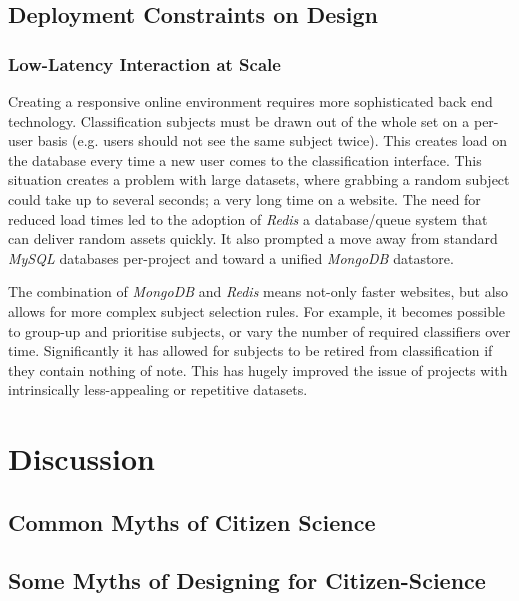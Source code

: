 \documentclass{sigchi}
\begin{document}
\subsection{Deployment Constraints on Design}

\subsubsection{Low-Latency Interaction at Scale}
Creating a responsive online environment requires more sophisticated back end technology. Classification subjects must be drawn out of the whole set on a per-user basis (e.g. users should not see the same subject twice). This creates load on the database every time a new user comes to the classification interface. This situation creates a problem with large datasets, where grabbing a random subject could take up to several seconds; a very long time on a website. The need for reduced load times led to the adoption of \emph{Redis} a database/queue system that can deliver random assets quickly. It also prompted a move away from standard \emph{MySQL} databases per-project and toward a unified \emph{MongoDB} datastore.

The combination of \emph{MongoDB} and \emph{Redis} means not-only faster websites, but also allows for more complex subject selection rules. For example, it becomes possible to group-up and prioritise subjects, or vary the number of required classifiers over time. Significantly it has allowed for subjects to be retired from classification if they contain nothing of note. This has hugely improved the issue of projects with intrinsically less-appealing or repetitive datasets.  


\section{Discussion}

\subsection{Common Myths of Citizen Science}
\subsection{Some Myths of Designing for Citizen-Science}
\end{document}
